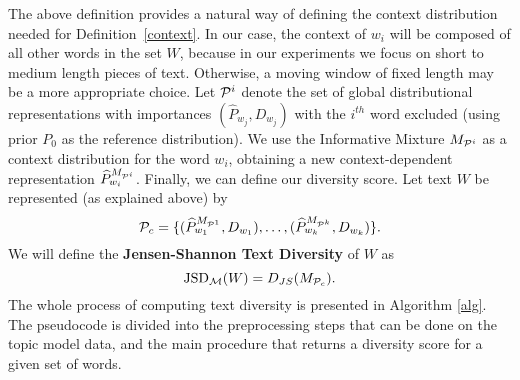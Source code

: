 The above definition provides a natural way of defining the context
distribution needed for Definition~\ref{context}. 
In our case, the context of $w_i$ will be composed of
all other words in the set $W$, because in our experiments we
focus on short to medium length pieces of text. Otherwise, a moving
window of fixed length may be a more appropriate choice. Let
${\mathcal P}^i$ denote the set of global distributional representations
with importances $(\widehat{P}_{w_j},D_{w_j})$ with the $i^{th}$ word
excluded (using prior $P_0$ as the reference
distribution). We use the Informative Mixture 
$M_{{\mathcal P}^i}$ as a context distribution for the word 
$w_i$, obtaining a new context-dependent representation
$\widehat{P}^{M_{{\mathcal P}^i}}_{w_i}$. Finally, we can define our diversity
score.
\bed\label{text-diversity}
 Let text $W$ be represented (as explained above) by
\[{\mathcal P}_c=\{(\widehat{P}^{M_{{\mathcal P}^1}}_{w_1},D_{w_1}),\dots,
(\widehat{P}^{M_{{\mathcal P}^k}}_{w_k},D_{w_k})\}.\] 
We will define the
{\bf Jensen-Shannon Text Diversity} of $W$ as
\[\textrm{JSD}_{\mathcal M}(W) = D_{JS}(M_{{\mathcal P}_c}).\]
\eed
The whole process of computing text diversity is
presented in Algorithm \ref{alg}. The pseudocode is divided into the
preprocessing steps that can be done on the topic model data, and the
main procedure that returns a diversity score for a given set of words.

